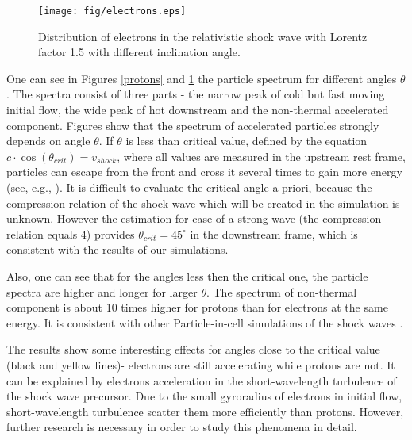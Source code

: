 \begin{figure}[h!]
	\centering
	\texttt{[image: fig/electrons.eps]} 
	\caption{Distribution of electrons in the relativistic shock wave with Lorentz factor 1.5 with different inclination angle.}
	\label{electrons}
\end{figure}

One can see in Figures \ref{protons} and \ref{electrons} the particle spectrum for different angles $\theta$. The spectra consist of three parts - the narrow peak of cold but fast moving initial flow, the wide peak of hot downstream and the non-thermal accelerated component. Figures show that the spectrum of accelerated particles strongly depends on angle $\theta$. If $\theta$ is less than critical value, defined by the equation $c\cdot \cos(\theta_{crit})=v_{shock}$, where all values are measured in the upstream rest frame, particles can escape from the front and cross it several times to gain more energy (see, e.g., \cite{Pelletier2017}). It is difficult to evaluate the critical angle a priori, because the compression relation of the shock wave which will be created in the simulation is unknown. However the estimation for case of a strong wave (the compression relation equals $4$) provides $\theta_{crit}=45^{\circ}$ in the downstream frame, which is consistent with the results of our simulations.

Also, one can see that for the angles less then the critical one, the particle spectra are higher and longer for larger $\theta$. The spectrum of non-thermal component is about 10 times higher for protons than for electrons at the same energy. It is consistent with other Particle-in-cell simulations of the shock waves {\cite{Sironi2011}}.

The results show some interesting effects for angles close to the critical value (black and yellow lines)- electrons are still accelerating while protons are not. It can be explained by electrons acceleration in the short-wavelength turbulence of the shock wave precursor. Due to the small gyroradius of electrons in initial flow, short-wavelength turbulence scatter them more efficiently than protons. However, further research is necessary in order to study this phenomena in detail.



